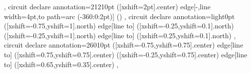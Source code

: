 {{  },
 circuit declare annotation={2121}{0pt} %
  {
   ([xshift=2pt]\tikzlastnode.center) edge[-,line width=4pt,to path={arc (-360:0:2pt)}] ()
  },
 circuit declare annotation={light}{0pt} %
  {
   ([xshift=-0.75\tikzcircuitssizeunit,yshift=1\tikzcircuitssizeunit]\tikzlastnode.north) edge[line to] ([xshift=-0.25\tikzcircuitssizeunit,yshift=0.1\tikzcircuitssizeunit]\tikzlastnode.north)
   ([xshift=-0.25\tikzcircuitssizeunit,yshift=1\tikzcircuitssizeunit]\tikzlastnode.north) edge[line to] ([xshift=0.25\tikzcircuitssizeunit,yshift=0.1\tikzcircuitssizeunit]\tikzlastnode.north)
  },
 circuit declare annotation={2601}{0pt} %
  {
   ([xshift=-0.75\tikzcircuitssizeunit,yshift=0.75\tikzcircuitssizeunit]\tikzlastnode.center) edge[line to] ([xshift=0.75\tikzcircuitssizeunit,yshift=0.75\tikzcircuitssizeunit]\tikzlastnode.center)
   ([xshift=-0.25\tikzcircuitssizeunit,yshift=0.75\tikzcircuitssizeunit]\tikzlastnode.center) edge[line to] ([xshift=0.65\tikzcircuitssizeunit,yshift=0.35\tikzcircuitssizeunit]\tikzlastnode.center)
  },
}

\makeatletter
\newcommand\currentcoordinate{\the\tikz@lastxsaved,\the\tikz@lastysaved}
\makeatother

\endinput
